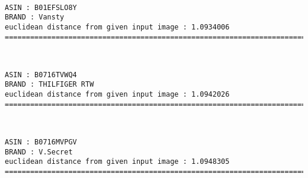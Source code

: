 \documentclass[11pt]{article}
\begin{document}
    \begin{center}
    \end{center}
    { \hspace*{\fill} \\}
    
    \begin{Verbatim}[commandchars=\\\{\}]
ASIN : B01EFSLO8Y
BRAND : Vansty
euclidean distance from given input image : 1.0934006
=============================================================================================================================

    \end{Verbatim}

    \begin{center}
    \end{center}
    { \hspace*{\fill} \\}
    
    \begin{Verbatim}[commandchars=\\\{\}]
ASIN : B0716TVWQ4
BRAND : THILFIGER RTW
euclidean distance from given input image : 1.0942026
=============================================================================================================================

    \end{Verbatim}

    \begin{center}
    \end{center}
    { \hspace*{\fill} \\}
    
    \begin{Verbatim}[commandchars=\\\{\}]
ASIN : B0716MVPGV
BRAND : V.Secret
euclidean distance from given input image : 1.0948305
=============================================================================================================================

    \end{Verbatim}

    \begin{center}
    \end{center}
    { \hspace*{\fill} \\}
    
\end{document}
